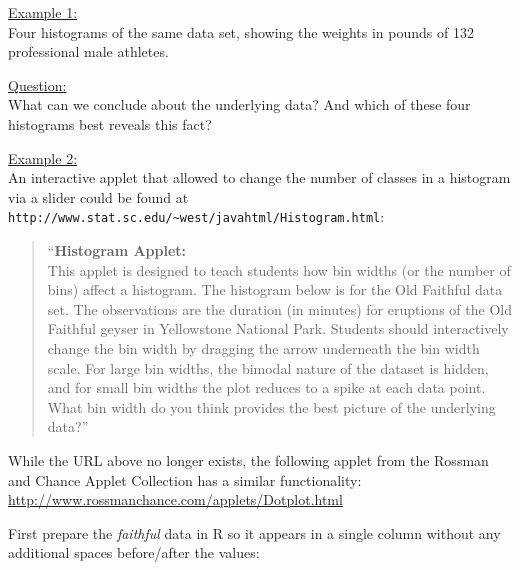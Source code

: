 \documentclass[12pt,letterpaper,final]{article}
\begin{document}
\noindent
\underline{Example 1:} \\
Four histograms of the same data set, showing the
weights in pounds of 132 professional male athletes.



\noindent
\underline{Question:} \\
What can we conclude about the underlying data? 
And which of these four histograms best reveals this fact?


\newpage


\noindent
\underline{Example 2:} \\
An interactive applet that allowed to change the number of classes
in a histogram via a slider could be found at
\verb|http://www.stat.sc.edu/~west/javahtml/Histogram.html|:
\begin{quotation}
\noindent
``{\bf Histogram Applet:} \\[0.2cm]
This applet is designed to teach students how bin widths (or the number of bins) 
affect a histogram. The histogram below is for the Old Faithful data set. The observations 
are the duration (in minutes) for eruptions of the Old Faithful geyser in 
Yellowstone National Park. Students should interactively change the bin width 
by dragging the arrow underneath the bin width scale. For large bin widths, 
the bimodal nature of the dataset is hidden, and for small bin widths the plot 
reduces to a spike at each data point. What bin width do you think provides 
the best picture of the underlying data?''
\end{quotation}


While the URL above no longer exists, the following applet 
from the Rossman and Chance Applet Collection has a similar functionality:
\url{http://www.rossmanchance.com/applets/Dotplot.html}

First prepare the {\it faithful} data in R so it appears in a single column
without any additional spaces before/after the values:

\begin{Schunk}
\end{Schunk}
\end{document}
